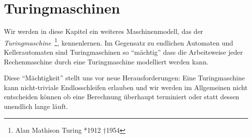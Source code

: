 \section{Turingmaschinen}
\newcommand{\M}{\mathcal{M}}
\newcommand{\godel}[1]{\ulcorner #1 \urcorner}
\newcommand{\D}{\mathcal{D}}
\newcommand{\mblank}{\text{\blank}}


Wir werden in diese Kapitel ein weiteres Maschinenmodell, das der \emph{Turingmaschine}~\footnote{Alan Mathison Turing *1912 †1954}, kennenlernen.
Im Gegensatz zu endlichen Automaten und Kellerautomaten
sind Turingmaschinen so ``mächtig''
dass die Arbeitsweise jeder Rechenmaschine durch eine Turingmaschine modelliert werden kann.

Diese ``Mächtigkeit'' stellt uns vor neue Herausforderungen:
Eine Turingmaschine kann nicht-triviale Endlosschleifen erlauben und wir werden im Allgemeinen 
nicht entscheiden können ob eine Berechnung überhaupt terminiert oder statt dessen unendlich lange läuft.


